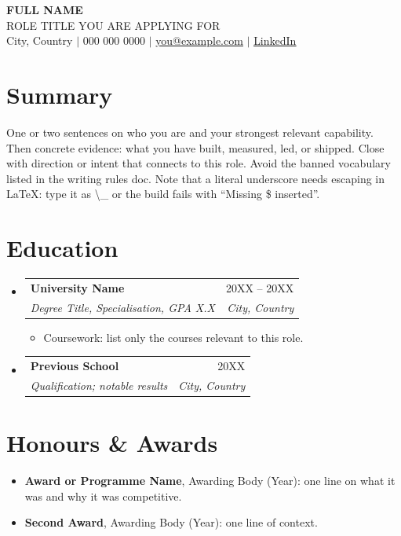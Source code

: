 \documentclass[letterpaper,11pt]{article}
\makeatletter
\newcommand{\resumeItem}[1]{
  \item\small{
    {#1 \vspace{-2pt}}
  }
}
\newcommand{\resumeSubheading}[4]{
  \vspace{-2pt}\item
    \begin{tabular*}{0.97\textwidth}[t]{l@{\extracolsep{\fill}}r}
      \textbf{#1} & #2 \\
      \textit{\small#3} & \textit{\small #4} \\
    \end{tabular*}\vspace{-7pt}
}
\newcommand{\resumeSubHeadingListStart}{\begin{itemize}[leftmargin=0.15in, label={}]}
\newcommand{\resumeSubHeadingListEnd}{\end{itemize}}
\newcommand{\resumeItemListStart}{\begin{itemize}}
\newcommand{\resumeItemListEnd}{\end{itemize}\vspace{-5pt}}
\makeatother
\begin{document}
\begin{center}
    \textbf{\Huge FULL NAME} \\ \vspace{2pt}
    \small ROLE TITLE YOU ARE APPLYING FOR \\ \vspace{3pt}
    \small
    City, Country $|$ 000 000 0000 $|$
    \href{mailto:you@example.com}{\underline{you@example.com}} $|$
    \href{https://www.linkedin.com/in/yourprofile/}{\underline{LinkedIn}}
\end{center}

\section{Summary}
\small{One or two sentences on who you are and your strongest relevant capability. Then
concrete evidence: what you have built, measured, led, or shipped. Close with direction
or intent that connects to this role. Avoid the banned vocabulary listed in the writing
rules doc. Note that a literal underscore needs escaping in LaTeX: type it as
\textbackslash\_ or the build fails with ``Missing \$ inserted''.}

\section{Education}
  \resumeSubHeadingListStart
    \resumeSubheading
      {University Name}{20XX -- 20XX}
      {Degree Title, Specialisation, GPA X.X}{City, Country}
      \resumeItemListStart
        \resumeItem{Coursework: list only the courses relevant to this role.}
      \resumeItemListEnd
    \resumeSubheading
      {Previous School}{20XX}
      {Qualification; notable results}{City, Country}
  \resumeSubHeadingListEnd

\section{Honours \& Awards}
 \begin{itemize}[leftmargin=0.15in]
    \small
    \item \textbf{Award or Programme Name}, Awarding Body (Year): one line on what it was and why it was competitive.
    \item \textbf{Second Award}, Awarding Body (Year): one line of context.
 \end{itemize}
\end{document}
